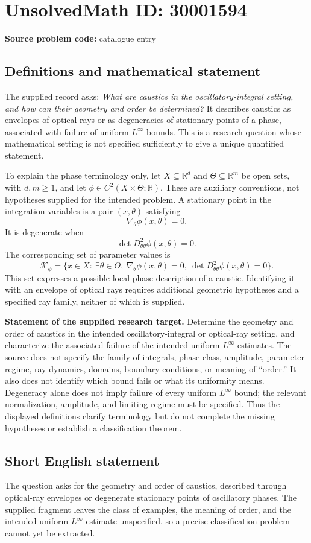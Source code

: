 \documentclass[11pt]{article}
\newcommand{\R}{\mathbb{R}}
\begin{document}
\section*{UnsolvedMath ID: 30001594}
\textbf{Source problem code:} catalogue entry
\subsection{Definitions and mathematical statement}
The supplied record asks: \emph{What are caustics in the oscillatory-integral setting, and how can their geometry and order be determined?} It describes caustics as envelopes of optical rays or as degeneracies of stationary points of a phase, associated with failure of uniform \(L^\infty\) bounds. This is a research question whose mathematical setting is not specified sufficiently to give a unique quantified statement.

To explain the phase terminology only, let \(X\subseteq\R^d\) and \(\Theta\subseteq\R^m\) be open sets, with \(d,m\geq1\), and let \(\phi\in C^2(X\times\Theta;\R)\). These are auxiliary conventions, not hypotheses supplied for the intended problem. A stationary point in the integration variables is a pair \((x,\theta)\) satisfying
\[
\nabla_\theta\phi(x,\theta)=0.
\]
It is degenerate when
\[
\det D^2_{\theta\theta}\phi(x,\theta)=0.
\]
The corresponding set of parameter values is
\[
\mathcal K_\phi=\bigl\{x\in X:\ \exists\theta\in\Theta,\ \nabla_\theta\phi(x,\theta)=0,\ \det D^2_{\theta\theta}\phi(x,\theta)=0\bigr\}.
\]
This set expresses a possible local phase description of a caustic. Identifying it with an envelope of optical rays requires additional geometric hypotheses and a specified ray family, neither of which is supplied.

\textbf{Statement of the supplied research target.} Determine the geometry and order of caustics in the intended oscillatory-integral or optical-ray setting, and characterize the associated failure of the intended uniform \(L^\infty\) estimates. The source does not specify the family of integrals, phase class, amplitude, parameter regime, ray dynamics, domains, boundary conditions, or meaning of ``order.'' It also does not identify which bound fails or what its uniformity means. Degeneracy alone does not imply failure of every uniform \(L^\infty\) bound; the relevant normalization, amplitude, and limiting regime must be specified. Thus the displayed definitions clarify terminology but do not complete the missing hypotheses or establish a classification theorem.
\subsection{Short English statement}
The question asks for the geometry and order of caustics, described through optical-ray envelopes or degenerate stationary points of oscillatory phases. The supplied fragment leaves the class of examples, the meaning of order, and the intended uniform \(L^\infty\) estimate unspecified, so a precise classification problem cannot yet be extracted.
\end{document}
